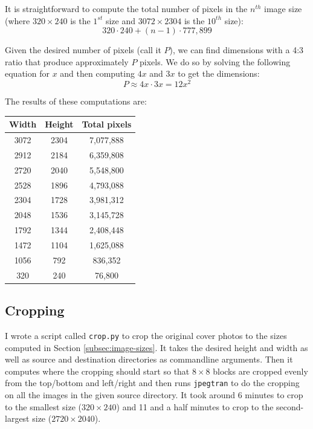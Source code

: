 \documentclass[11pt,a4paper]{report}
\begin{document}
It is straightforward to compute the total number of pixels in the $n^{th}$ image size (where $320 \times 240$ is the $1^{st}$ size and $3072 \times 2304$ is the $10^{th}$ size):
\begin{equation*}
320 \cdot 240 + (n-1) \cdot 777,899
\end{equation*}

Given the desired number of pixels (call it $P$), we can find dimensions with a 4:3 ratio that produce approximately $P$ pixels. We do so by solving the following equation for $x$ and then computing $4x$ and $3x$ to get the dimensions:
\begin{equation*}
 P \approx 4x \cdot 3x = 12x^2
 \end{equation*}

The results of these computations are:
\begin{center}
\begin{tabular}{ c  c | c}
Width & Height & Total pixels \\ \hline
3072 & 2304 & 7,077,888 \\
2912 & 2184 & 6,359,808 \\
2720 & 2040 & 5,548,800 \\
2528 & 1896 & 4,793,088 \\
2304 & 1728 & 3,981,312 \\
2048 & 1536 & 3,145,728 \\
1792 & 1344 & 2,408,448 \\
1472 & 1104 & 1,625,088 \\
1056 & 792 & 836,352 \\
320 & 240 & 76,800 \\
\end{tabular}
\end{center}


\subsection{Cropping}
\label{subsec:cropping}

I wrote a script called \texttt{crop.py} to crop the original cover photos to the sizes computed in Section \ref{subsec:image-sizes}. It takes the desired height and width as well as source and destination directories as commandline arguments. Then it computes where the cropping should start so that $8 \times 8$ blocks are cropped evenly from the top/bottom and left/right and then runs \texttt{jpegtran} to do the cropping on all the images in the given source directory. It took around 6 minutes to crop to the smallest size ($320 \times 240$) and 11 and a half minutes to crop to the second-largest size ($2720 \times 2040$).
\end{document}
